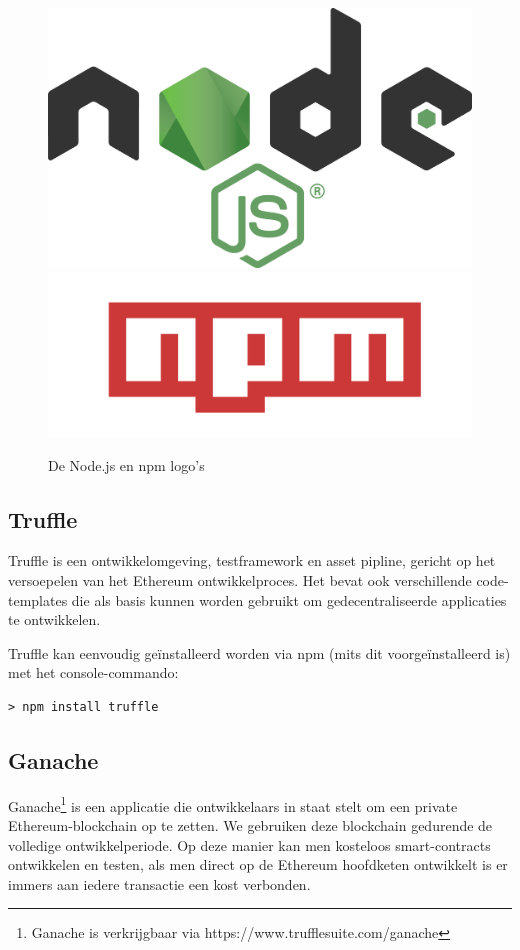 	\begin{figure}
		\includegraphics[width=\linewidth/2]{img/nodejs.png}
		\includegraphics[width=\linewidth/2]{img/npm.png}
		\caption{De Node.js en npm logo's}
		\label{fig:nodejs}
	\end{figure}
	
	\subsection{Truffle}
	Truffle is een ontwikkelomgeving, testframework en asset pipline, gericht op het versoepelen van het Ethereum ontwikkelproces. Het bevat ook verschillende code-templates die als basis kunnen worden gebruikt om gedecentraliseerde applicaties te ontwikkelen.
	
	Truffle kan eenvoudig geïnstalleerd worden via npm (mits dit  voorgeïnstalleerd is) met het console-commando:
	 \lstset{language=bash}
	\begin{lstlisting}[numbers=none]
	> npm install truffle
	\end{lstlisting}
	\subsection{Ganache}
	Ganache\footnote{Ganache is verkrijgbaar via https://www.trufflesuite.com/ganache} is een applicatie die ontwikkelaars in staat stelt om een private Ethereum-blockchain op te zetten. We gebruiken deze blockchain gedurende de volledige ontwikkelperiode. Op deze manier kan men kosteloos smart-contracts ontwikkelen en testen, als men direct op de Ethereum hoofdketen ontwikkelt is er  immers aan iedere transactie  een kost verbonden. 
	
